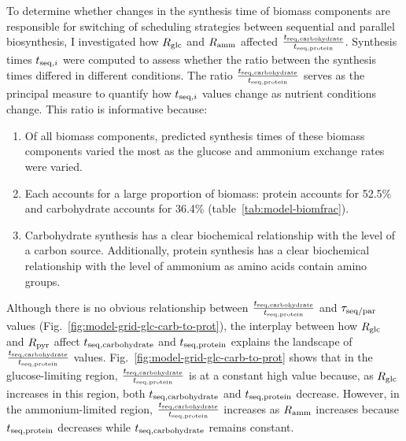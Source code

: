 To determine whether changes in the synthesis time of biomass components are responsible for switching of scheduling strategies between sequential and parallel biosynthesis, I investigated how $R_{\mathrm{glc}}$ and $R_{\mathrm{amm}}$ affected $\frac{t_{\mathrm{seq},\mathrm{carbohydrate}}}{t_{\mathrm{seq},\mathrm{protein}}}$.
Synthesis times $t_{\mathrm{seq},i}$ were computed to assess whether the ratio between the synthesis times differed in different conditions.
The ratio $\frac{t_{\mathrm{seq},\mathrm{carbohydrate}}}{t_{\mathrm{seq},\mathrm{protein}}}$ serves as the principal measure to quantify how $t_{\mathrm{seq},i}$ values change as nutrient conditions change.
This ratio is informative because:
\begin{enumerate}
  \item Of all biomass components, predicted synthesis times of these biomass components varied the most as the glucose and ammonium exchange rates were varied.
  \item Each accounts for a large proportion of biomass: protein accounts for 52.5\% and carbohydrate accounts for 36.4\% (table~\ref{tab:model-biomfrac}).
  \item Carbohydrate synthesis has a clear biochemical relationship with the level of a carbon source.
        Additionally, protein synthesis has a clear biochemical relationship with the level of ammonium as amino acids contain amino groups.
\end{enumerate}



Although there is no obvious relationship between $\frac{t_{\mathrm{seq},\mathrm{carbohydrate}}}{t_{\mathrm{seq},\mathrm{protein}}}$ and $\tau_{\mathrm{seq}/\mathrm{par}}$ values (Fig.\ \ref{fig:model-grid-glc-carb-to-prot}),
the interplay between how $R_{\mathrm{glc}}$ and $R_{\mathrm{pyr}}$ affect $t_{\mathrm{seq},\mathrm{carbohydrate}}$ and $t_{\mathrm{seq},\mathrm{protein}}$ explains the landscape of $\frac{t_{\mathrm{seq},\mathrm{carbohydrate}}}{t_{\mathrm{seq},\mathrm{protein}}}$ values.
Fig.\ \ref{fig:model-grid-glc-carb-to-prot} shows that in the glucose-limiting region, $\frac{t_{\mathrm{seq},\mathrm{carbohydrate}}}{t_{\mathrm{seq},\mathrm{protein}}}$ is at a constant high value because, as $R_{\mathrm{glc}}$ increases in this region, both $t_{\mathrm{seq},\mathrm{carbohydrate}}$ and $t_{\mathrm{seq},\mathrm{protein}}$ decrease.
However, in the ammonium-limited region, $\frac{t_{\mathrm{seq},\mathrm{carbohydrate}}}{t_{\mathrm{seq},\mathrm{protein}}}$ increases as $R_{\mathrm{amm}}$ increases because $t_{\mathrm{seq},\mathrm{protein}}$ decreases while $t_{\mathrm{seq},\mathrm{carbohydrate}}$ remains constant.

